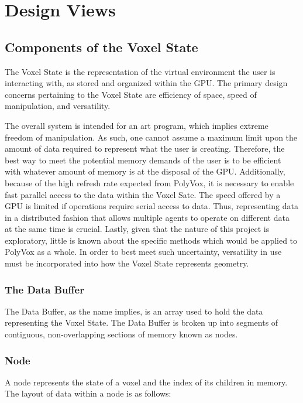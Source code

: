\documentclass[onecolumn, draftclsnofoot,10pt, compsoc]{IEEEtran}
\begin{document}
\section{Design Views}

\subsection{Components of the Voxel State}

The Voxel State is the representation of the virtual environment the user is interacting with, as stored and organized within the GPU. The primary design concerns pertaining to the Voxel State are efficiency of space, speed of manipulation, and versatility. 

The overall system is intended for an art program, which implies extreme freedom of manipulation. As such, one cannot assume a maximum limit upon the amount of data required to represent what the user is creating. Therefore, the best way to meet the potential memory demands of the user is to be efficient with whatever amount of memory is at the disposal of the GPU. Additionally, because of the high refresh rate expected from PolyVox, it is necessary to enable fast parallel access to the data within the Voxel Sate. The speed offered by a GPU is limited if operations require serial access to data. Thus, representing data in a distributed fashion that allows multiple agents to operate on different data at the same time is crucial. Lastly, given that the nature of this project is exploratory, little is known about the specific methods which would be applied to PolyVox as a whole. In order to best meet such uncertainty, versatility in use must be incorporated into how the Voxel State represents geometry.

\subsubsection{The Data Buffer} 

The Data Buffer, as the name implies, is an array used to hold the data representing the Voxel State. The Data Buffer is broken up into segments of contiguous, non-overlapping sections of memory known as nodes.

\subsubsection{Node}
A node represents the state of a voxel and the index of its children in memory. The layout of data within a node is as follows: \\
\end{document}
